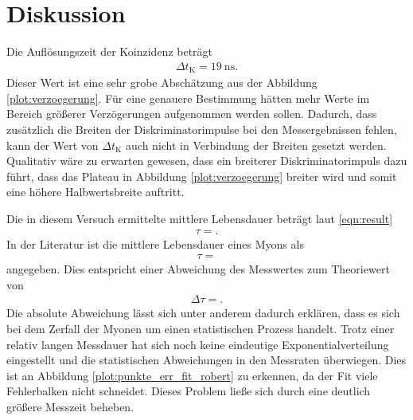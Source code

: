 \section{Diskussion}
\label{sec:Diskussion}

Die Auflösungszeit der Koinzidenz beträgt
\begin{align*}
  \Delta t_\text{K} = \SI{19}{\nano\second}.
\end{align*}
Dieser Wert ist eine sehr grobe Abschätzung aus der Abbildung \ref{plot:verzoegerung}.
Für eine genauere Bestimmung hätten mehr Werte im Bereich größerer Verzögerungen aufgenommen werden sollen.
Dadurch, dass zusätzlich die Breiten der Diskriminatorimpulse bei den Messergebnissen fehlen, kann der Wert von $\Delta t_\text{K}$ auch nicht in Verbindung der Breiten gesetzt werden.
Qualitativ wäre zu erwarten gewesen, dass ein breiterer Diskriminatorimpuls dazu führt, dass das Plateau in Abbildung \ref{plot:verzoegerung} breiter wird und somit eine höhere Halbwertsbreite auftritt. %

Die in diesem Versuch ermittelte mittlere Lebensdauer beträgt laut \eqref{eqn:result}
\begin{align*}
  \tau = .
\end{align*}
In der Literatur \cite{Agashe:2014kda} ist die mittlere Lebensdauer eines Myons als
\begin{align*}
  \tau = 
\end{align*}
angegeben.
Dies entspricht einer Abweichung des Messwertes zum Theoriewert von
\begin{align*}
  \Delta \tau = .
\end{align*}
Die absolute Abweichung lässt sich unter anderem dadurch erklären, dass es sich bei dem Zerfall der Myonen um einen statistischen Prozess handelt.
Trotz einer relativ langen Messdauer hat sich noch keine eindeutige Exponentialverteilung eingestellt und die statistischen Abweichungen in den Messraten überwiegen.
Dies ist an Abbildung \ref{plot:punkte_err_fit_robert} zu erkennen, da der Fit viele Fehlerbalken nicht schneidet.
Dieses Problem ließe sich durch eine deutlich größere Messzeit beheben.\\

